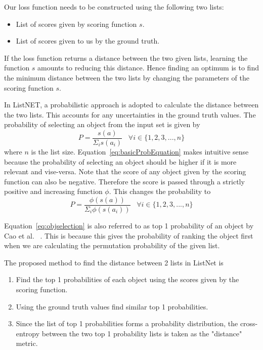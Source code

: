 \documentclass[12pt, twoside, ngerman]{report}
\begin{document}
Our loss function needs to be constructed using the following two lists:
\begin{itemize}
\item List of scores given by scoring function $s$.
\item List of scores given to us by the ground truth.
\end{itemize}
If the loss function returns a distance between the two given lists, learning the function $s$ amounts to reducing this distance. Hence finding an optimum is to find the minimum distance between the two lists by changing the parameters of the scoring function $s$.

In ListNET, a probabilistic approach is adopted to calculate the distance between the two lists. This accounts for any uncertainties in the ground truth values.
The probability of selecting an object from the input set is given by
\begin{equation}
\label{eq:basicProbEquation}
P = \frac{s(a)}{\Sigma_i s(a_i)} \;\;\; \forall i \in \{1, 2, 3, ...,  n\}
\end{equation}
where $n$ is the list size.
Equation~\ref{eq:basicProbEquation} makes intuitive sense because the probability of selecting an object should be higher if it is more relevant and vise-versa.
Note that the score of any object given by the scoring function can also be negative.
Therefore the score is passed through a strictly positive and increasing function $\phi$.
This changes the probability to
\begin{equation}\label{eq:objselection}
P = \frac{\phi(s(a))}{\Sigma_i \phi(s(a_i))} \;\;\; \forall i \in \{1, 2, 3, ...,  n\}
\end{equation}

Equation~\ref{eq:objselection} is also referred to as top 1 probability of an object by Cao et al. ~\cite{listwisebetter}.
This is because this gives the probability of ranking the object first when we are calculating the permutation probability of the given list.

The proposed method to find the distance between 2 lists in ListNet is
\begin{enumerate}
\item Find the top 1 probabilities of each object using the scores given by the scoring function.
\item Using the ground truth values find similar top 1 probabilities.
\item Since the list of top 1 probabilities forms a probability distribution, the cross-entropy between the two top 1 probability lists is taken as the "distance" metric.
\end{enumerate}
\end{document}
